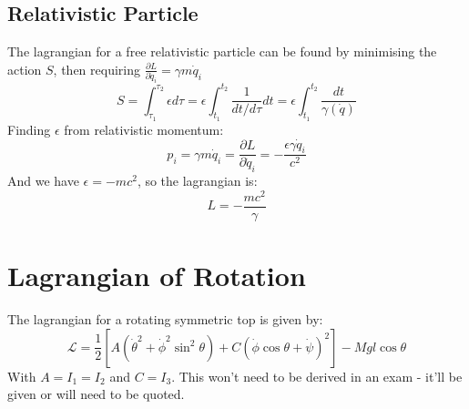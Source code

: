 \documentclass[table,cmyk]{article}
\begin{document}
\begin{longtable}
  \subsection*{Relativistic Particle}
  The lagrangian for a free relativistic particle can be found by minimising the
  action $S$, then requiring $\frac{\partial L}{\partial \dot q_i}=\gamma m \dot
  q_i$
  \begin{displaymath}
   S=
   \int_{\tau_1}^{\tau_2}\epsilon d\tau=\epsilon\int_{t_1}^{t_2}\frac{1}{dt/d\tau}dt
    =\epsilon\int_{t_1}^{t_2}\frac{dt}{\gamma(\dot q)}
  \end{displaymath}
  Finding $\epsilon$ from relativistic momentum:
  \begin{displaymath}
    p_i=\gamma m \dot q_i=\frac{\partial L}{\partial \dot
      q_i}=-\frac{\epsilon\gamma\dot q_i}{c^2}
  \end{displaymath}
  And we have $\epsilon = -mc^2$, so the lagrangian is:
  \begin{displaymath}
   L=-\frac{mc^2}{\gamma} 
  \end{displaymath}
\tabularnewline\hline
\section*{Lagrangian of Rotation}
  The lagrangian for a rotating symmetric top is given by:
  \begin{displaymath}
   \mathcal{L}
   =\frac{1}{2}[A(\dot\theta^2+\dot\phi^2\sin^2\theta)+C(\dot\phi\cos\theta + \dot\psi)^2]-Mgl\cos\theta
  \end{displaymath}
  With $A=I_1=I_2$ and $C=I_3$. This won't need to be derived in an exam - it'll be given or will need to be quoted.
\end{longtable}
\end{document}
